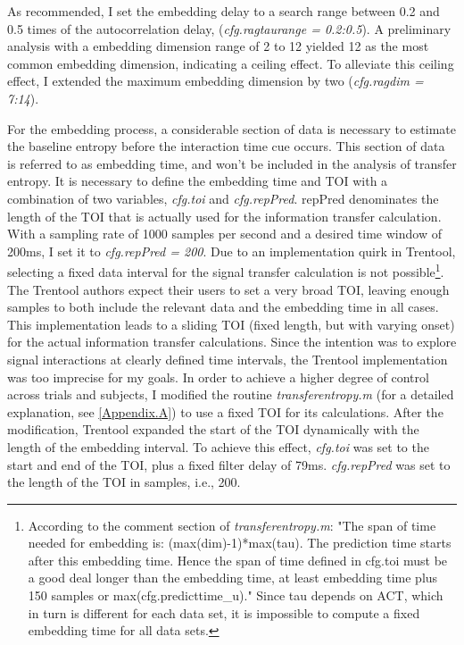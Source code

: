 As recommended, I set the embedding delay to a search range between 0.2 and 0.5 times of the autocorrelation delay, (\emph{cfg.ragtaurange = 0.2:0.5}).
A preliminary analysis with a embedding dimension range of 2 to 12 yielded 12 as the most common embedding dimension, indicating a ceiling effect.
To alleviate this ceiling effect, I extended the maximum embedding dimension by two (\emph{cfg.ragdim = 7:14}).

For the embedding process, a considerable section of data is necessary to estimate the baseline entropy before the interaction time cue occurs.
This section of data is referred to as embedding time, and won't be included in the analysis of transfer entropy.
It is necessary to define the embedding time and TOI with a combination of two variables, \emph{cfg.toi} and \emph{cfg.repPred}.
repPred denominates the length of the TOI that is actually used for the information transfer calculation.
With a sampling rate of 1000 samples per second and a desired time window of 200ms, I set it to \emph{cfg.repPred = 200}.
Due to an implementation quirk in Trentool, selecting a fixed data interval for the signal transfer calculation is not possible\footnote{According to the comment section of \emph{transferentropy.m}: "The span of time needed for embedding is: (max(dim)-1)*max(tau). The prediction time starts after this embedding time. Hence the span of time defined in cfg.toi must be a good deal longer than the embedding time, at least embedding time plus 150 samples or max(cfg.predicttime_u)."
Since tau depends on ACT, which in turn is different for each data set, it is impossible to compute a fixed embedding time for all data sets.}. The Trentool authors expect their users to set a very broad TOI, leaving enough samples to both include the relevant data and the embedding time in all cases.
This implementation leads to a sliding TOI (fixed length, but with varying onset) for the actual information transfer calculations.
Since the intention was to explore signal interactions at clearly defined time intervals, the Trentool implementation was too imprecise for my goals.
In order to achieve a higher degree of control across trials and subjects, I modified the routine \emph{transferentropy.m} (for a detailed explanation, see \ref{Appendix.A}) to use a fixed TOI for its calculations.
After the modification, Trentool expanded the start of the TOI dynamically with the length of the embedding interval.
To achieve this effect, \emph{cfg.toi} was set to the start and end of the TOI, plus a fixed filter delay of 79ms.
\emph{cfg.repPred} was set to the length of the TOI in samples, i.e., 200.

